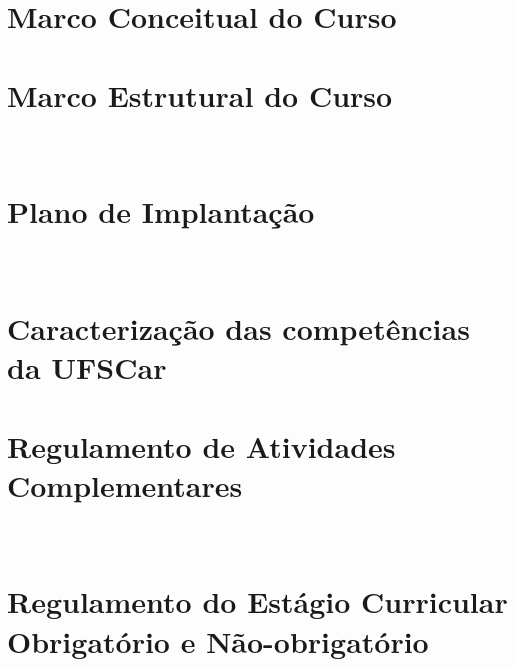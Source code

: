 \documentclass[11pt,a4paper]{report}
\begin{document}
\chapter{Marco Conceitual do Curso}\label{cha:MarcoConceitual}



\chapter{Marco Estrutural do Curso}~\label{cha:MarcoEstrutural}



\chapter{Plano de Implantação}~\label{cha:implantacao}





\clearpage
% 
% 
\printbibliography[heading = bibintoc, title = {Referências Bibliográficas}]



\appendix

\chapter{Caracterização das competências da UFSCar}\label{cha:competencias}



\chapter{Regulamento de Atividades Complementares}~\label{cha:atividades_complementares}



\chapter{Regulamento do Estágio Curricular Obrigatório e Não-obrigatório}~\label{cha:estagio}

\end{document}
